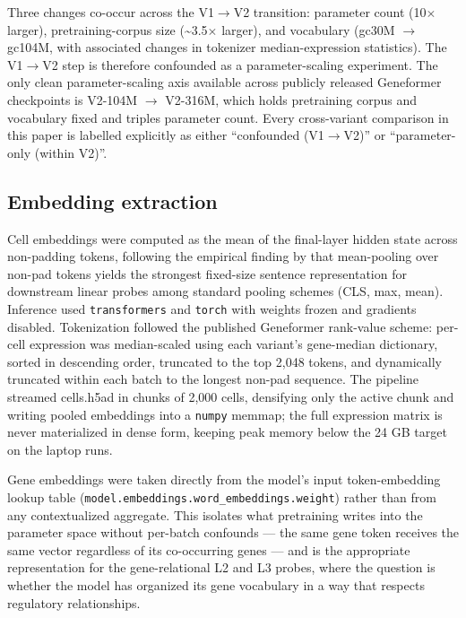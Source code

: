 \documentclass[10pt]{article}
\begin{document}
Three changes co-occur across the V1$\to$V2 transition: parameter count (10$\times$
larger), pretraining-corpus size (\textasciitilde3.5$\times$ larger), and
vocabulary (gc30M $\to$ gc104M, with associated changes in tokenizer
median-expression statistics). The V1$\to$V2 step is therefore confounded as
a parameter-scaling experiment. The only clean parameter-scaling axis
available across publicly released Geneformer checkpoints is V2-104M $\to$
V2-316M, which holds pretraining corpus and vocabulary fixed and triples
parameter count. Every cross-variant comparison in this paper is
labelled explicitly as either ``confounded (V1$\to$V2)'' or ``parameter-only
(within V2)''.

\subsection{Embedding extraction}\label{embedding-extraction}

Cell embeddings were computed as the mean of the final-layer hidden
state across non-padding tokens, following the empirical finding by
\citet{reimers2019sbert} that mean-pooling over non-pad tokens yields
the strongest fixed-size sentence representation for downstream linear
probes among standard pooling schemes (CLS, max, mean). Inference used
\texttt{transformers} \citep{wolf2020transformers} and \texttt{torch} \citep{paszke2019pytorch} with weights frozen and gradients disabled. Tokenization
followed the published Geneformer rank-value scheme: per-cell expression
was median-scaled using each variant's gene-median dictionary, sorted in
descending order, truncated to the top 2,048 tokens, and dynamically
truncated within each batch to the longest non-pad sequence. The
pipeline streamed cells.h5ad in chunks of 2,000 cells, densifying only
the active chunk and writing pooled embeddings into a \texttt{numpy}
memmap; the full expression matrix is never materialized in dense form,
keeping peak memory below the 24 GB target on the laptop runs.

Gene embeddings were taken directly from the model's input
token-embedding lookup table
(\texttt{model.embeddings.word\_embeddings.weight}) rather than from any
contextualized aggregate. This isolates what pretraining writes into the
parameter space without per-batch confounds --- the same gene token
receives the same vector regardless of its co-occurring genes --- and is
the appropriate representation for the gene-relational L2 and L3 probes,
where the question is whether the model has organized its gene
vocabulary in a way that respects regulatory relationships.
\end{document}

